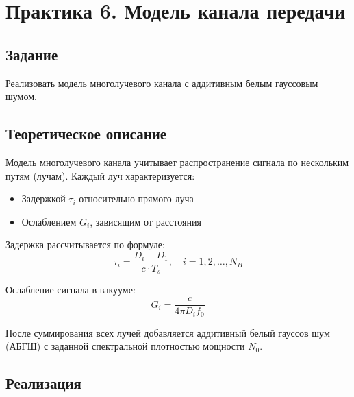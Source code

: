 \chapter{Практика 6. Модель канала передачи}

\section{Задание}
Реализовать модель многолучевого канала с аддитивным белым гауссовым шумом.

\section{Теоретическое описание}
Модель многолучевого канала учитывает распространение сигнала по нескольким путям (лучам). Каждый луч характеризуется:
\begin{itemize}
    \item Задержкой $\tau_i$ относительно прямого луча
    \item Ослаблением $G_i$, зависящим от расстояния
\end{itemize}

Задержка рассчитывается по формуле:
\[
\tau_i = \frac{D_i - D_1}{c \cdot T_s}, \quad i = 1, 2, \ldots, N_B
\]

Ослабление сигнала в вакууме:
\[
G_i = \frac{c}{4\pi D_i f_0}
\]

После суммирования всех лучей добавляется аддитивный белый гауссов шум (АБГШ) с заданной спектральной плотностью мощности $N_0$.

\section{Реализация}

